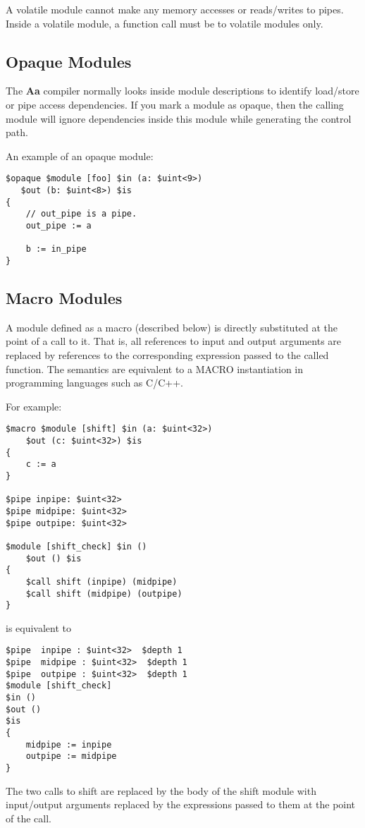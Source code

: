 \documentclass{article}
\begin{document}
A volatile module cannot make any memory accesses or 
reads/writes to pipes.  Inside a volatile module, 
a function call must be to volatile modules only.

\subsection{Opaque Modules}

The {\bf Aa} compiler normally looks inside module
descriptions to identify load/store or pipe access
dependencies.  If you mark a module as opaque, then
the calling module will ignore dependencies inside
this module while generating the control path.

An example of an opaque module:
\begin{verbatim}
$opaque $module [foo] $in (a: $uint<9>)
   $out (b: $uint<8>) $is
{
    // out_pipe is a pipe.
    out_pipe := a

    b := in_pipe
}
\end{verbatim}



\subsection{Macro Modules}

A module defined as a macro (described below)
is directly substituted at the point of a call
to it.  That is, all references to input and
output arguments
are replaced by references to the corresponding
expression passed to the called function.  
The semantics are equivalent to a MACRO instantiation
in programming languages such as C/C++.

For example:
\begin{verbatim}
$macro $module [shift] $in (a: $uint<32>) 
    $out (c: $uint<32>) $is
{
    c := a 
}  

$pipe inpipe: $uint<32>
$pipe midpipe: $uint<32>
$pipe outpipe: $uint<32>

$module [shift_check] $in () 
    $out () $is
{
    $call shift (inpipe) (midpipe)
    $call shift (midpipe) (outpipe)
}

\end{verbatim}
is equivalent to 
\begin{verbatim}
$pipe  inpipe : $uint<32>  $depth 1 
$pipe  midpipe : $uint<32>  $depth 1 
$pipe  outpipe : $uint<32>  $depth 1 
$module [shift_check]
$in ()
$out ()
$is
{
    midpipe := inpipe
    outpipe := midpipe
}
\end{verbatim}
The two calls to shift are replaced by
the body of the shift module with input/output arguments
replaced by the expressions passed to them
at the point of the call.
\end{document}
